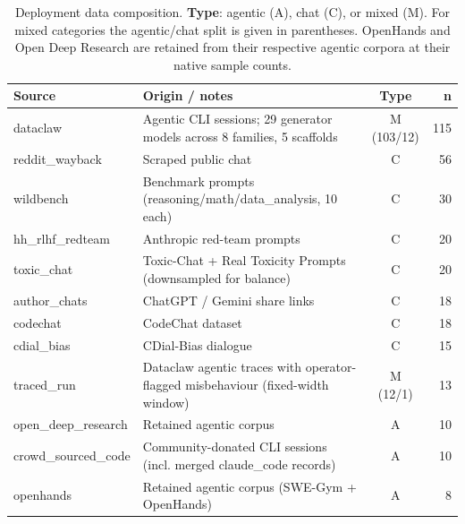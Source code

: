 \documentclass{article}
\begin{document}
\begin{table}[!htbp]
\centering
\small
\caption{Deployment data composition. \textbf{Type}: agentic (A), chat (C), or mixed (M). For mixed categories the agentic/chat split is given in parentheses. OpenHands and Open Deep Research are retained from their respective agentic corpora at their native sample counts.}
\label{tab:deploy_sources}
\begin{tabular}{p{3.4cm}p{6.6cm}cr}
\toprule
\textbf{Source} & \textbf{Origin / notes} & \textbf{Type} & \textbf{n} \\
\midrule
dataclaw \citep{omalley2026dataclaw} & Agentic CLI sessions; 29 generator models across 8 families, 5 scaffolds & M (103/12) & 115 \\
reddit\_wayback                      & Scraped public chat                                                       & C          & 56  \\
wildbench \citep{lin2024wildbench}          & Benchmark prompts (reasoning/math/data\_analysis, 10 each)                & C          & 30  \\
hh\_rlhf\_redteam \citep{bai2022hh}  & Anthropic red-team prompts                                                & C          & 20  \\
toxic\_chat \citep{lin2023toxicchat,gehman2020realtoxicityprompts} & Toxic-Chat + Real Toxicity Prompts (downsampled for balance) & C          & 20  \\
author\_chats                        & ChatGPT / Gemini share links                                              & C          & 18  \\
codechat \citep{zhong2025codechat}   & CodeChat dataset                                                          & C          & 18  \\
cdial\_bias \citep{zhou2022cdialbias} & CDial-Bias dialogue                                                      & C          & 15  \\
traced\_run \citep{tracedrun2026}    & Dataclaw agentic traces with operator-flagged misbehaviour (fixed-width window) & M (12/1) & 13 \\
open\_deep\_research \citep{roucher2025smolagents} & Retained agentic corpus                                     & A          & 10  \\
crowd\_sourced\_code \citep{yan2026sharechat}                & Community-donated CLI sessions (incl. merged claude\_code records)        & A          & 10  \\
openhands \citep{wang2024openhands}  & Retained agentic corpus (SWE-Gym + OpenHands)                             & A          & 8   \\
\bottomrule
\end{tabular}
\end{table}
\end{document}
